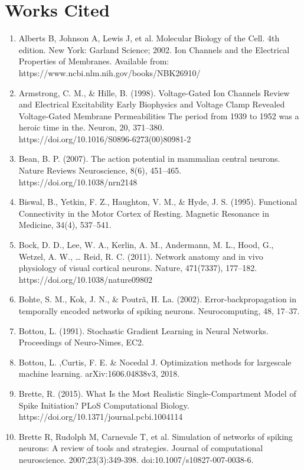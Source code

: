 \documentclass[11pt]{article}
\begin{document}
\section{Works Cited}


\begin{enumerate}
\item Alberts B, Johnson A, Lewis J, et al. Molecular Biology of the Cell. 4th edition. New York: Garland Science; 2002. Ion Channels and the Electrical Properties of Membranes. Available from: https://www.ncbi.nlm.nih.gov/books/NBK26910/
\item Armstrong, C. M., \& Hille, B. (1998). Voltage-Gated Ion Channels Review and Electrical Excitability Early Biophysics and Voltage Clamp Revealed Voltage-Gated Membrane Permeabilities The period from 1939 to 1952 was a heroic time in the. Neuron, 20, 371–380.\\ https://doi.org/10.1016/S0896-6273(00)80981-2
\item Bean, B. P. (2007). The action potential in mammalian central neurons. Nature Reviews Neuroscience, 8(6), 451–465. https://doi.org/10.1038/nrn2148
\item Biswal, B., Yetkin, F. Z., Haughton, V. M., \& Hyde, J. S. (1995). Functional Connectivity in the Motor Cortex of Resting. Magnetic Resonance in Medicine, 34(4), 537–541.
\item Bock, D. D., Lee, W. A., Kerlin, A. M., Andermann, M. L., Hood, G., Wetzel, A. W., … Reid, R. C. (2011). Network anatomy and in vivo physiology of visual cortical neurons. Nature, 471(7337), 177–182. https://doi.org/10.1038/nature09802
\item Bohte, S. M., Kok, J. N., \& Poutrã, H. La. (2002). Error-backpropagation in temporally encoded networks of spiking neurons. Neurocomputing, 48, 17–37.
\item Bottou, L. (1991). Stochastic Gradient Learning in Neural Networks. Proceedings of Neuro-Nimes, EC2.
\item Bottou, L. ,Curtis, F. E. \& Nocedal J. Optimization methods for largescale
machine learning. arXiv:1606.04838v3, 2018.
\item Brette, R. (2015). What Is the Most Realistic Single-Compartment Model of Spike Initiation? PLoS Computational Biology. https://doi.org/10.1371/journal.pcbi.1004114
\item Brette R, Rudolph M, Carnevale T, et al. Simulation of networks of spiking neurons: A review of tools and strategies. Journal of computational neuroscience. 2007;23(3):349-398. doi:10.1007/s10827-007-0038-6.

\end{enumerate}
\end{document}
